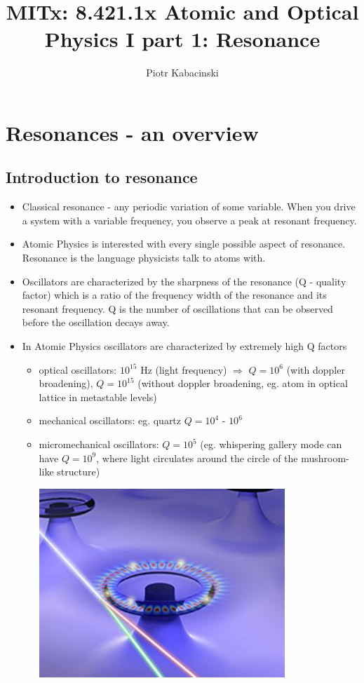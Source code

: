 
\title{MITx: 8.421.1x Atomic and Optical Physics I part 1: Resonance}
\author{Piotr Kabacinski}

\maketitle

\section{Resonances - an overview}

	\subsection{Introduction to resonance}
				\begin{itemize}
					\item Classical resonance - any periodic variation of some variable. When you drive a system with a variable frequency, you observe a peak at resonant frequency.
					\item Atomic Physics is interested with every single possible aspect of resonance. Resonance is the language physicists talk to atoms with.
					\item Oscillators are characterized by the sharpness of the resonance (Q - quality factor) which is a ratio of the frequency width of the resonance and its resonant frequency. Q is the number of oscillations that can be observed before the oscillation decays away.
					\item In Atomic Physics oscillators are characterized by extremely high Q factors
						\begin{itemize}
							\item optical oscillators: $10^{15}$ Hz (light frequency) $\Rightarrow$ $Q = 10^6$	(with doppler broadening), $Q = 10^{15}$ (without doppler broadening, eg. atom in optical lattice in metastable levels)
							\item mechanical oscillators: eg. quartz $Q = 10^4$ - $10^6$
							\item micromechanical oscillators: $Q = 10^5$ (eg. whispering gallery mode can have $Q = 10^9$, where light circulates around the circle of the mushroom-like structure)
							
							\includegraphics{whispering}
							

\end{itemize}
\end{itemize}
